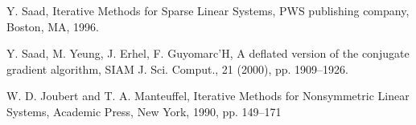 \documentclass[10pt,a4paper]{article}
\begin{document}
\begin{thebibliography}{9}
Y. Saad, Iterative Methods for Sparse Linear Systems, PWS publishing company, Boston, MA, 1996. 

Y. Saad, M. Yeung, J. Erhel, F. Guyomarc’H, A deflated version of the conjugate gradient algorithm, SIAM J. Sci. Comput., 21 (2000), pp. 1909–1926.

W. D. Joubert and T. A. Manteuffel, Iterative Methods for Nonsymmetric Linear Systems, Academic Press, New York, 1990, pp. 149–171 

\end{thebibliography}
\end{document}
